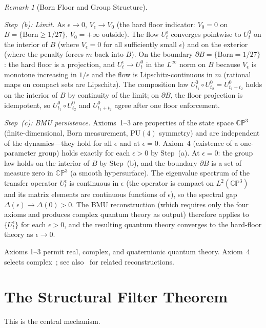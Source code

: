 \documentclass[11pt,a4paper]{article}
\theoremstyle{definition}
\theoremstyle{remark}
\newtheorem{remark}[theorem]{Remark}
\newcommand{\CP}{\mathbb{CP}}
\begin{document}
\begin{remark}[Born Floor and Group Structure]
\begin{enumerate}[nosep]
\emph{Step~(b): Limit.} As $\epsilon\to 0$, $V_\epsilon\to V_0$ (the hard floor indicator: $V_0=0$ on $B=\{\mathrm{Born}\geq 1/27\}$, $V_0=+\infty$ outside). The flow $U_t^\epsilon$ converges pointwise to $U_t^0$ on the interior of $B$ (where $V_\epsilon=0$ for all sufficiently small $\epsilon$) and on the exterior (where the penalty forces $m$ back into $B$). On the boundary $\partial B=\{\mathrm{Born}=1/27\}$: the hard floor is a projection, and $U_t^\epsilon\to U_t^0$ in the $L^\infty$ norm on $B$ because $V_\epsilon$ is monotone increasing in $1/\epsilon$ and the flow is Lipschitz-continuous in $m$ (rational maps on compact sets are Lipschitz). The composition law $U_{t_1}^0\circ U_{t_2}^0=U_{t_1+t_2}^0$ holds on the interior of $B$ by continuity of the limit; on $\partial B$, the floor projection is idempotent, so $U_{t_1}^0\circ U_{t_2}^0$ and $U_{t_1+t_2}^0$ agree after one floor enforcement.

\emph{Step~(c): BMU persistence.} Axioms~1--3 are properties of the state space $\CP^3$ (finite-dimensional, Born measurement, $\mathrm{PU}(4)$ symmetry) and are independent of the dynamics---they hold for all $\epsilon$ and at $\epsilon=0$. Axiom~4 (existence of a one-parameter group) holds exactly for each $\epsilon>0$ by Step~(a). At $\epsilon=0$: the group law holds on the interior of $B$ by Step~(b), and the boundary $\partial B$ is a set of measure zero in $\CP^3$ (a smooth hypersurface). The eigenvalue spectrum of the transfer operator $U_t^\epsilon$ is continuous in $\epsilon$ (the operator is compact on $L^2(\CP^3)$ and its matrix elements are continuous functions of $\epsilon$), so the spectral gap $\Delta(\epsilon)\to\Delta(0)>0$. The BMU reconstruction (which requires only the four axioms and produces complex quantum theory as output) therefore applies to $\{U_t^\epsilon\}$ for each $\epsilon>0$, and the resulting quantum theory converges to the hard-floor theory as $\epsilon\to 0$.
\end{enumerate}

Axioms 1--3 permit real, complex, and quaternionic quantum theory. Axiom~4 selects complex~\cite{BMU2014}; see also~\cite{Chiribella2011,Hardy2001} for related reconstructions.
\end{remark}


\section{The Structural Filter Theorem}\label{sec:filter}

This is the central mechanism.
\end{document}
